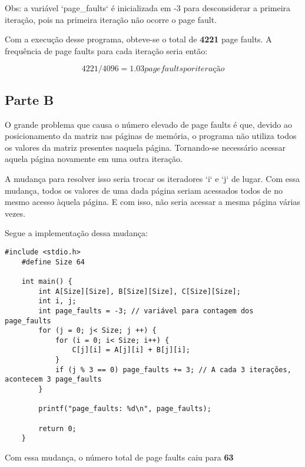 Obs: a variável `page_faults` é inicializada em -3 para
 desconsiderar a primeira iteração, pois na primeira iteração
 não ocorre o page fault. 

Com a execução desse programa, obteve-se o total de \textbf{4221}
 page faults. A frequência de page faults para cada iteração seria então:

 \[4221/4096 = 1.03 page faults por iteração\]



\subsection*{Parte B}

O grande problema que causa o número elevado de page faults é que,
 devido ao posicionamento da matriz nas páginas de memória, o
 programa não utiliza todos os valores da matriz presentes naquela
 página. Tornando-se necessário acessar aquela página novamente
 em uma outra iteração.

A mudança para resolver isso seria trocar os iteradores `i` e `j` de lugar.
 Com essa mudança, todos os valores de uma dada página seriam acessados todos de
 no mesmo acesso àquela página. E com isso, não seria acessar a mesma
 página várias vezes.

Segue a implementação dessa mudança:

\begin{lstlisting}[style=CStyle]
    #include <stdio.h>
    #define Size 64
    
    int main() {
        int A[Size][Size], B[Size][Size], C[Size][Size];
        int i, j;
        int page_faults = -3; // variável para contagem dos page_faults
        for (j = 0; j< Size; j ++) {
            for (i = 0; i< Size; i++) {
                C[j][i] = A[j][i] + B[j][i];
            }
            if (j % 3 == 0) page_faults += 3; // A cada 3 iterações, acontecem 3 page_faults
        }
    
        printf("page_faults: %d\n", page_faults);
    
        return 0;
    }
\end{lstlisting}

Com essa mudança, o número total de page
 faults caiu para \textbf{63}